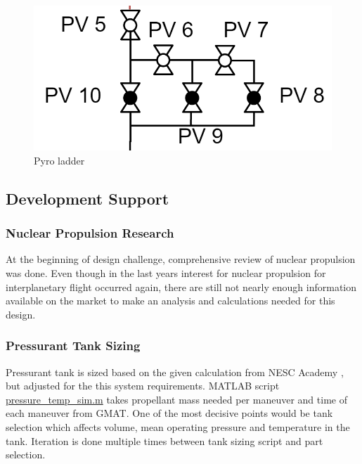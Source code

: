 \begin{figure}[H]
  \centering
  \includegraphics[width=0.7\linewidth]{img/pyroladder.png}
  \caption{Pyro ladder}
  \label{fig:pyro}
\end{figure}


\subsection{Development Support}

\subsubsection{Nuclear Propulsion Research}

At the beginning of design challenge, comprehensive review of nuclear propulsion was done. Even though in the last years interest for nuclear propulsion for interplanetary flight occurred again, there are still not nearly enough information available on the market to make an analysis and calculations needed for this design.

\subsubsection{Pressurant Tank Sizing}


Pressurant tank is sized based on the given calculation from NESC Academy \cite{BottleBl30:online}, but adjusted for the this system requirements. MATLAB script \href{https://github.com/Sven-J-Steinert/MomenTUM/blob/main/MATLAB/pressure_temp_sim.m}{\colorbox{codegray}{pressure\_temp\_sim.m}} takes propellant mass needed per maneuver and time of each maneuver from GMAT. One of the most decisive points would be tank selection which affects volume, mean operating pressure and temperature in the tank. Iteration is done multiple times between tank sizing script and part selection.